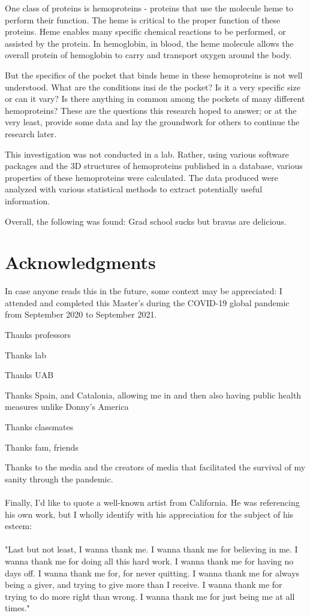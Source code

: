 \documentclass[12pt,oneside,a4paper,twocolumn]{report}
\begin{document}
		One class of proteins is hemoproteins - proteins that use the molecule heme to perform their function. The heme is critical to the proper function of these proteins. Heme enables many specific chemical reactions to be performed, or assisted by the protein. In hemoglobin, in blood, the heme molecule allows the overall protein of hemoglobin to carry and transport oxygen around the body.
		
		But the specifics of the pocket that binds heme in these hemoproteins is not well understood. What are the conditions insi	de the pocket? Is it a very specific size or can it vary? Is there anything in common among the pockets of many different hemoproteins? These are the questions this research hoped to answer; or at the very least, provide some data and lay the groundwork for others to continue the research later.
		
		This investigation was not conducted in a lab. Rather, using various software packages and the 3D structures of hemoproteins published in a database, various properties of these hemoproteins were calculated. The data produced were analyzed with various statistical methods to extract potentially useful information.
		
		Overall, the following was found:
		Grad school sucks but bravas are delicious.
	
	\chapter*{Acknowledgments}
	
		In case anyone reads this in the future, some context may be appreciated: I attended and completed this Master's during the COVID-19 global pandemic from September 2020 to September 2021.
		
		Thanks professors
		
		Thanks lab
		
		Thanks UAB
		
		Thanks Spain, and Catalonia, allowing me in and then also having public health measures unlike Donny's America
		
		Thanks classmates
		
		Thanks fam, friends
		
		Thanks to the media and the creators of media that facilitated the survival of my sanity through the pandemic.
		\\~\\
		Finally, I'd like to quote a well-known artist from California. He was referencing his own work, but I wholly identify with his appreciation for the subject of his esteem:
		\\~\\
		"Last but not least, I wanna thank me. I wanna thank me for believing in me. I wanna thank me for doing all this hard work. I wanna thank me for having no days off. I wanna thank me for, for never quitting. I wanna thank me for always being a giver, and trying to give more than I receive. I wanna thank me for trying to do more right than wrong. I wanna thank me for just being me at all times."
		
\end{document}
